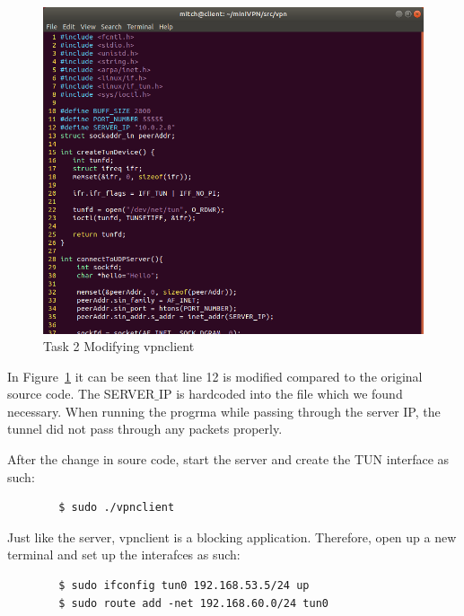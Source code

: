 \documentclass[12pt]{article}
\begin{document}
    \begin{figure}[H]
        \begin{center}
            \includegraphics[scale=0.45]{t2_mody_vpnclient.png}
        \end{center}{}
        \caption{Task 2 Modifying vpnclient}
        \label{fig:t2_modify_vpnclient}
    \end{figure}

    In Figure~\ref{fig:t2_modify_vpnclient} it can be seen that line 12 is modified compared to the original source code. The SERVER$\_$IP is hardcoded into the file which we found necessary. When running the progrma while passing through the server IP, the tunnel did not pass through any packets properly.

    After the change in soure code, start the server and create the TUN interface as such:
    \begin{verbatim}
        $ sudo ./vpnclient
    \end{verbatim}
    Just like the server, vpnclient is a blocking application. Therefore, open up a new terminal and set up the interafces as such:
    \begin{verbatim}
        $ sudo ifconfig tun0 192.168.53.5/24 up
        $ sudo route add -net 192.168.60.0/24 tun0
    \end{verbatim}
\end{document}
